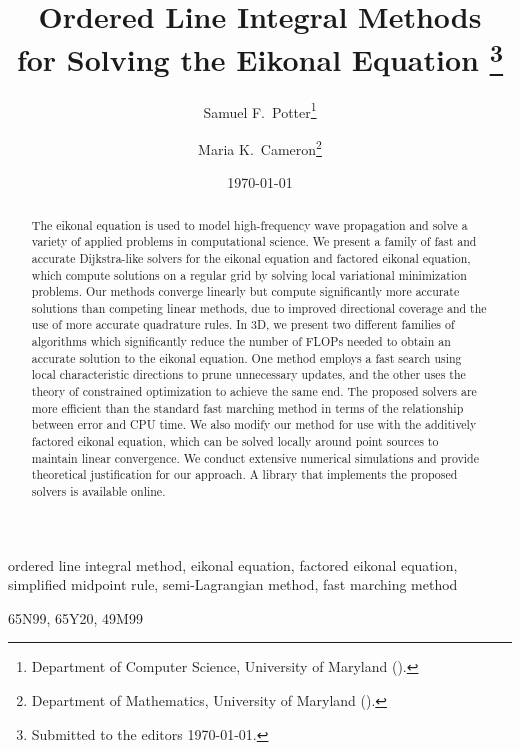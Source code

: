 \documentclass[eikonal.tex]{subfiles}
\begin{document}
\title{
  Ordered Line Integral Methods \\
  for Solving the Eikonal Equation
  \thanks{Submitted to the editors \today.}
}
\author{
  Samuel F.\ Potter\thanks{Department of Computer Science,
    University of Maryland ().}
  \and Maria K.\ Cameron\thanks{Department of Mathematics,
    University of Maryland ().}
}
\date{\today}

\maketitle

\begin{abstract}
  The eikonal equation is used to model high-frequency wave
  propagation and solve a variety of applied problems in computational
  science. We present a family of fast and accurate Dijkstra-like
  solvers for the eikonal equation and factored eikonal equation,
  which compute solutions on a regular grid by solving local
  variational minimization problems. Our methods converge linearly but
  compute significantly more accurate solutions than competing linear
  methods, due to improved directional coverage and the use of more
  accurate quadrature rules. In 3D, we present two different families
  of algorithms which significantly reduce the number of FLOPs needed
  to obtain an accurate solution to the eikonal equation. One method
  employs a fast search using local characteristic directions to prune
  unnecessary updates, and the other uses the theory of constrained
  optimization to achieve the same end. The proposed solvers are more
  efficient than the standard fast marching method in terms of the
  relationship between error and CPU time. We also modify our method
  for use with the additively factored eikonal equation, which can be
  solved locally around point sources to maintain linear
  convergence. We conduct extensive numerical simulations and provide
  theoretical justification for our approach. A library that
  implements the proposed solvers is available online.
\end{abstract}

\begin{keywords}
  ordered line integral method, eikonal equation, factored eikonal
  equation, simplified midpoint rule, semi-Lagrangian method, fast
  marching method
\end{keywords}

\begin{AMS}
  65N99, 65Y20, 49M99
\end{AMS}
\end{document}

